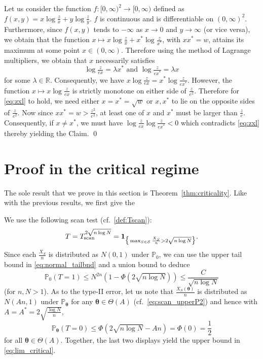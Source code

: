 \documentclass[11pt,reqno,letterpaper]{amsart}
\numberwithin{equation}{section}
\theoremstyle{plain}
\def \btheta{\boldsymbol{\theta}}
\def \P{\mathbb{P}}
\def \R{\mathbb{R}}
\begin{document}
 Let us consider the function $f: [0, \infty)^2 \to [0, \infty)$ defined as $f(x, y) = x \log \tfrac zx + y \log \tfrac {z}{y}$. $f$ is 
continuous and is differentiable on $(0, \infty)^2$. Furthermore, since $f(x, y)$ tends to $-\infty$ as $x \to 0$ and $y \to \infty$ (or 
vice versa), we obtain that the function $x \mapsto x \log \tfrac zx + x^\ast \log \tfrac {z}{x^\ast}$, with $xx^\ast = w$, attains its maximum at some point $x \in 
(0, \infty)$. Therefore using the method of Lagrange multipliers, we obtain that 
$x$ necessarily satisfies
\begin{equation}\label{eq:zxl}
\log \tfrac z{ex} = \lambda x^\ast \mbox{ and } \log \tfrac z{ex^\ast} = \lambda x
\end{equation}
for some $\lambda \in \R$. Consequently, we have $x \log \tfrac z{ex}  = x^\ast \log \tfrac z{ex^\ast}$. However, the function $x \mapsto x \log \tfrac z{ex}$ is strictly monotone on either side of $\tfrac z{e^2}$. Therefore for \eqref{eq:zxl} to hold, we need either $x = x^\ast = \sqrt{w}$ or $x, x^\ast$ to lie on 
the opposite sides of $\tfrac z{e^2}$. Now since $xx^\ast = w > \tfrac{z^2}{e^2}$, 
at least one of $x$ and $x^\ast$ must be larger than $\tfrac{z}e$. Consequently, if 
$x \ne x^\ast$, we must have $\log \tfrac z{ex} \log \tfrac z{ex^\ast} < 0$ which 
contradicts \eqref{eq:zxl} thereby yielding the Claim. \qed


\section{Proof in the critical regime}\label{sec:criticality} 
The sole result that we prove in this section is Theorem~\ref{thm:criticality}. 
Like with the previous results, we first give the

\smallskip

 We use the following scan test (cf.~\eqref{def:Tscan}):
\begin{equation*}
T = T_{{\rm scan}}^{2\sqrt{n \log N}} = \mathbf 1_{\big\{\max_{S \in \mathcal S} \frac {X_S}{n} > 2\sqrt{n \log N}\big\}}.
\end{equation*}
Since each $\frac{X_S}n$ is distributed as $N(0, 1)$ under $\P_0$, we can use the upper tail bound in \eqref{eq:normal_tailbnd} and a 
union bound to deduce
\begin{equation*}
\P_0(T = 1) \le N^{2n} (1 - \Phi(2 \sqrt{n \log N})) \le \frac C {\sqrt{n \log N}}
\end{equation*}
(for $n, N > 1$). As to the type-II error, let us note that $\frac{X_S(\btheta)}n$ 
is distributed as $N(An, 1)$ under $\P_{\btheta}$ for any $\btheta \in \Theta(A)$ (cf.~\eqref{eq:scan_upperP2}) and hence with $A = A^\ast = 2\sqrt{\frac{\log N}n}$,
\begin{equation*}
\P_{\btheta}(T = 0) \le \Phi(2\sqrt{n\log N} - An) = \Phi(0) =  \frac12
\end{equation*}
for all $\btheta \in \Theta(A)$. Together, the last two displays yield the upper bound in \eqref{eq:lim_critical}.
\end{document}
